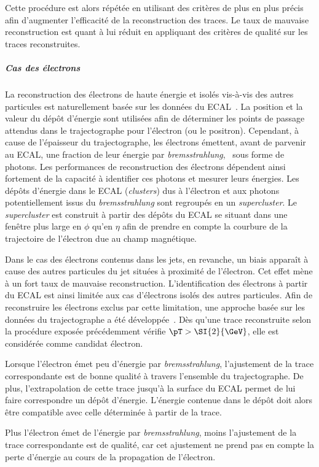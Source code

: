 Cette procédure est alors répétée en utilisant des critères de plus en plus précis afin d'augmenter l'efficacité de la reconstruction des traces.
Le taux de mauvaise reconstruction est quant à lui réduit en appliquant des critères de qualité sur les traces reconstruites.
\subparagraph{Cas des électrons}
La reconstruction des électrons de haute énergie et isolés vis-à-vis des autres particules est naturellement basée sur les données du ECAL~\cite{electron_reco_8tev}.
La position et la valeur du dépôt d'énergie sont utilisées afin de déterminer les points de passage attendus dans le trajectographe pour l'électron (ou le positron).
Cependant, à cause de l'épaisseur du trajectographe, les électrons émettent, avant de parvenir au ECAL, une fraction de leur énergie par \emph{bremsstrahlung}, \ie\ sous forme de photons.
Les performances de reconstruction des électrons dépendent ainsi fortement de la capacité à identifier ces photons et mesurer leurs énergies.
Les dépôts d'énergie dans le ECAL (\emph{clusters}) dus à l'électron et aux photons potentiellement issus du \emph{bremsstrahlung} sont regroupés en un \emph{supercluster}.
Le \emph{supercluster} est construit à partir des dépôts du ECAL se situant dans une fenêtre plus large en $\phi$ qu'en $\eta$ afin de prendre en compte la courbure de la trajectoire de l'électron due au champ magnétique.
\par
Dans le cas des électrons contenus dans les jets, en revanche, un biais apparaît à cause des autres particules du jet situées à proximité de l'électron.
Cet effet mène à un fort taux de mauvaise reconstruction.
L'identification des électrons à partir du ECAL est ainsi limitée aux cas d'électrons isolés des autres particules.
Afin de reconstruire les électrons exclus par cette limitation, une approche basée sur les données du trajectographe a été développée~\cite{particle-flow}.
Dès qu'une trace reconstruite selon la procédure exposée précédemment vérifie $\pT>\SI{2}{\GeV}$, elle est considérée comme candidat électron.
\par
Lorsque l'électron émet peu d'énergie par \emph{bremsstrahlung}, l'ajustement de la trace correspondante est de bonne qualité à travers l'ensemble du trajectographe.
De plus, l'extrapolation de cette trace jusqu'à la surface du ECAL permet de lui faire correspondre un dépôt d'énergie.
L'énergie contenue dans le dépôt doit alors être compatible avec celle déterminée à partir de la trace.
\par
Plus l'électron émet de l'énergie par \emph{bremsstrahlung}, moins l'ajustement de la trace correspondante est de qualité, car cet ajustement ne prend pas en compte la perte d'énergie au cours de la propagation de l'électron.
